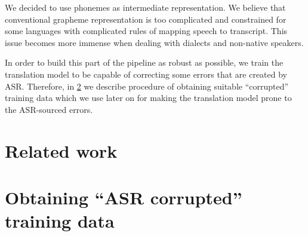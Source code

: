 We decided to use phonemes as intermediate representation. We believe that conventional grapheme representation is too complicated and constrained for some languages with complicated rules of mapping speech to transcript. This issue becomes more immense when dealing with dialects and non-native speakers.

In order to build this part of the pipeline as robust as possible, we train the translation model to be capable of correcting some errors that are created by ASR. Therefore, in \cref{sec:asr_corrupted} we describe procedure of obtaining suitable ``corrupted'' training data which we use later on for making the translation model prone to the ASR-sourced errors.

\section{Related work}

\section{Obtaining ``ASR corrupted'' training data}
\label{sec:asr_corrupted}

